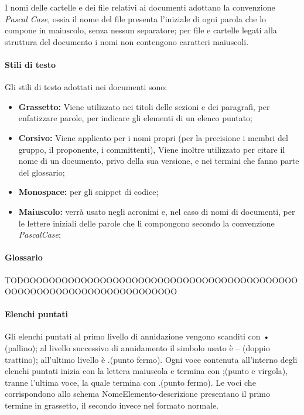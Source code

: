 I nomi delle cartelle e dei file relativi ai documenti adottano la convenzione \textit{Pascal Case}, ossia il nome del file presenta l'iniziale di ogni parola che lo compone in maiuscolo, senza nessun separatore; per file e cartelle legati alla struttura del documento i nomi non contengono caratteri maiuscoli.

\paragraph{Stili di testo}

Gli stili di testo adottati nei documenti sono: 

\begin{itemize}

	\item \textbf{Grassetto:} Viene utilizzato nei titoli delle sezioni e dei paragrafi, per enfatizzare parole, per indicare gli elementi di un elenco puntato;
	\item \textbf{Corsivo:} Viene applicato per i nomi propri (per la precisione i membri del gruppo, il proponente, i committenti), Viene inoltre utilizzato per citare il nome di un documento, privo della sua versione, e nei termini che fanno parte del glossario;
	\item \textbf{Monospace:} per gli snippet di codice;
	\item \textbf{Maiuscolo:} verrà usato negli acronimi e, nel caso di nomi di documenti, per le lettere iniziali delle parole che li compongono secondo la convenzione \textit{PascalCase};

\end{itemize}

\paragraph{Glossario}  

TODOOOOOOOOOOOOOOOOOOOOOOOOOOOOOOOOOOOOOOOOOOOOOOOOOOOOOOOOOOOOOOOOOOOOOO

\paragraph{Elenchi puntati}

Gli elenchi puntati al primo livello di annidazione vengono scanditi con • (pallino); al livello successivo di annidamento il simbolo usato è -- (doppio trattino); all'ultimo livello è .(punto fermo).\newline
Ogni voce contenuta all'interno degli elenchi puntati inizia con la lettera maiuscola e termina con ;(punto e virgola), tranne l'ultima voce, la quale termina con .(punto fermo).\newline
Le voci che corrispondono allo schema NomeElemento-descrizione presentano il primo termine in grassetto, il secondo invece nel formato normale. 

